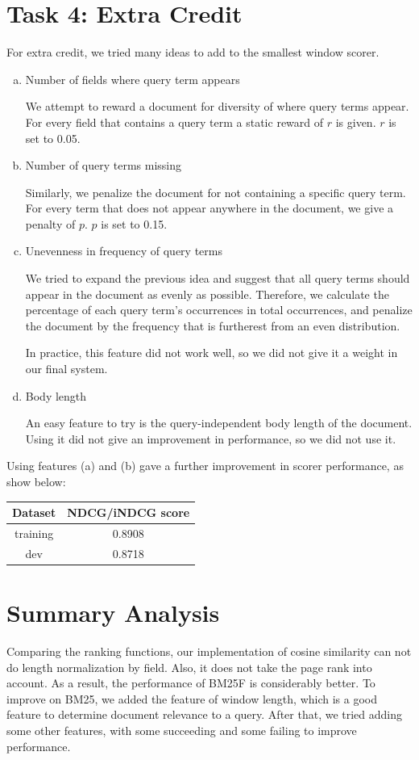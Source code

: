 \documentclass[10pt,twocolumn]{article}
\begin{document}
\section*{Task 4: Extra Credit}
For extra credit, we tried many ideas to add to the smallest window scorer.
\begin{enumerate}[(a)]
\item Number of fields where query term appears

We attempt to reward a document for diversity of where query terms appear. For every field that contains a query term a static reward of $r$ is given. $r$ is set to 0.05.
\item Number of query terms missing

Similarly, we penalize the document for not containing a specific query term. For every term that does not appear anywhere in the document, we give a penalty of $p$. $p$ is set to 0.15.
\item Unevenness in frequency of query terms

We tried to expand the previous idea and suggest that all query terms should appear in the document as evenly as possible. Therefore, we calculate the percentage of each query term's occurrences in total occurrences, and penalize the document by the frequency that is furtherest from an even distribution.

In practice, this feature did not work well, so we did not give it a weight in our final system.
\item Body length

An easy feature to try is the query-independent body length of the document. Using it did not give an improvement in performance, so we did not use it.
\end{enumerate}
Using features (a) and (b) gave a further improvement in scorer performance, as show below:
\begin{table}[H]
\centering
\begin{tabular}{|c|c|}
\hline
Dataset & NDCG/iNDCG score \\\hline
training & 0.8908\\\hline
dev & 0.8718\\\hline
\end{tabular}
\end{table}
\section*{Summary Analysis}
Comparing the ranking functions, our implementation of cosine similarity can not do length normalization by field. Also, it does not take the page rank into account. As a result, the performance of BM25F is considerably better. To improve on BM25, we added the feature of window length, which is a good feature to determine document relevance to a query. After that, we tried adding some other features, with some succeeding and some failing to improve performance. 
\end{document}
